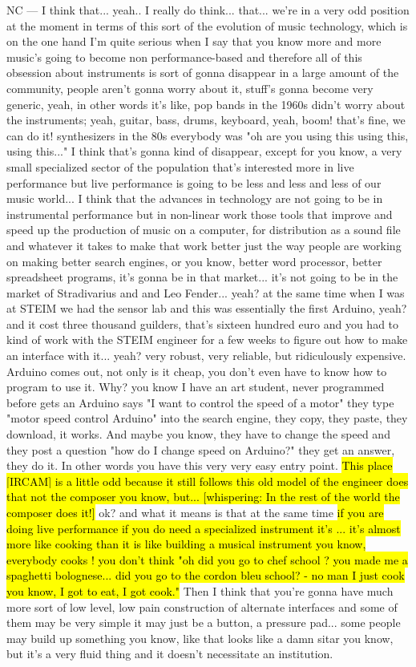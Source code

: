 NC — I think that... yeah..  I really do think... that... we're in a very odd position at the moment in terms of this sort of the evolution of music technology, which is on the one hand I'm quite serious when I say that you know more and more music's going to become non performance-based and therefore all of this obsession about instruments is sort of gonna disappear in a large amount of the community, people aren't gonna worry about it, stuff's gonna become very generic, yeah, in other words it's like, pop bands in the 1960s didn't worry about the instruments; yeah, guitar, bass, drums, keyboard, yeah, boom! that's fine, we can do it! synthesizers in the 80s everybody was "oh are you using this using this, using this..." I think that's gonna kind of disappear, except for you know, a very small specialized sector of the population that's interested more in live performance but live performance is going to be less and less and less of our music world... I think that the advances in technology are not going to be in instrumental performance but in non-linear work those tools that improve and speed up the production of music on a computer, for distribution as a sound file and whatever it takes to make that work better just the way people are working on making better search engines, or you know, better word processor, better spreadsheet programs, it's gonna be in that market... it's not going to be in the market of Stradivarius and and Leo Fender... yeah? at the same time when I was at STEIM we had the sensor lab and this was essentially the first Arduino, yeah? and it cost three thousand guilders, that's sixteen hundred euro and you had to kind of work with the STEIM engineer for a few weeks to figure out how to make an interface with it... yeah? very robust, very reliable, but ridiculously expensive. Arduino comes out, not only is it cheap, you don't even have to know how to program to use it. Why? you know I have an art student,  never programmed before gets an Arduino says "I want to control the speed of a motor" they type "motor speed control Arduino" into the search engine, they copy, they paste, they download, it works. And maybe you know, they have to change the speed and they post a question "how do I change speed on Arduino?" they get an answer, they do it. In other words you have this very very easy entry point. \hl{This place [IRCAM] is a little odd because it still follows this old model of the engineer does that not the composer you know, but... [whispering: In the rest of the world the composer does it!]} ok? and what it means is that at the same time \hl{if you are doing live performance if you do need a specialized instrument it's ... it's almost more like cooking than it is like building a musical instrument you know, everybody cooks ! you don't think "oh did you go to chef school ? you made me a spaghetti bolognese... did you go to the cordon bleu school? - no man I just cook you know, I got to eat, I got cook."}  Then I think that you're gonna have much more sort of low level,  low pain construction of alternate interfaces and some of them may be  very simple it may just be a button, a pressure pad... some people  may build up something you know, like that looks like a damn sitar you know, but it's a very fluid thing and it doesn't necessitate an institution. 